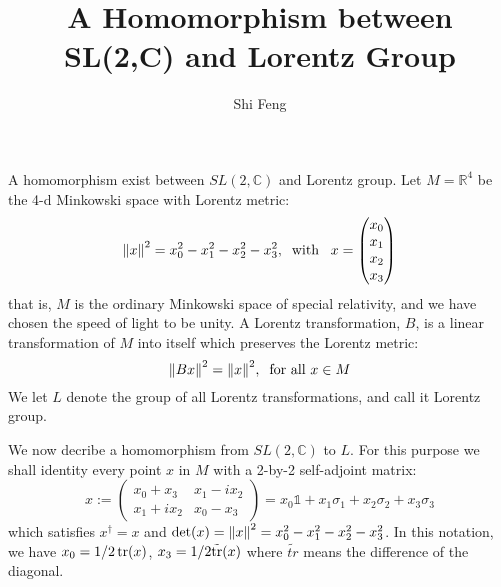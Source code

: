 \documentclass[11pt]{article}
\title{A Homomorphism between SL(2,C) and Lorentz Group}
\author{Shi Feng}
\date{}
\theoremstyle{remark}
\theoremstyle{definition}
\numberwithin{thm}{section}
\begin{document}
\maketitle
A homomorphism exist between $SL(2,\mathbb{C})$ and Lorentz group. Let  $M = \mathbb{R}^4$ be the 4-d Minkowski space with Lorentz metric:
\begin{equation}
	\norm{x}^2 = x_0^2 - x_1^2 - x_2^2 - x_3^2,\;\;\text{with}\;\;\; x = 
	\begin{pmatrix}
		x_0 \\ x_1 \\ x_2 \\ x_3
	\end{pmatrix}
\end{equation}
that is, $M$ is the ordinary Minkowski space of special relativity, and we have chosen the speed of light to be unity. A Lorentz transformation, $B$, is a linear transformation of $M$ into itself which preserves the Lorentz metric:
\begin{equation}
	\norm{Bx}^2 = \norm{x}^2,\;\;\text{for all }x \in M
\end{equation}
We let $L$ denote the group of all Lorentz transformations, and call it Lorentz group.

We now decribe a homomorphism from  $SL(2,\mathbb{C})$ to $L$. For this purpose we shall identity every point  $x$ in $M$ with a 2-by-2 self-adjoint matrix:
\begin{equation}
	x := 
	\begin{pmatrix}
		x_0 + x_3 & x_1 - ix_2 \\
		x_1 + ix_2 & x_0 - x_3
	\end{pmatrix}
	= x_0 \mathbb{1} + x_1 \sigma_1 + x_2 \sigma_2 + x_3 \sigma_3
\end{equation}
which satisfies $x^\dagger = x$ and $\det(x) = \norm{x}^2 = x_0^2 - x_1^2 - x_2^2 - x_3^2$. In this notation, we have  $x_0 = 1/2\tr(x)$,  $x_3 = 1/2\tilde{\tr}(x)$ where  $\tilde{tr}$ means the difference of the diagonal.
\end{document}
